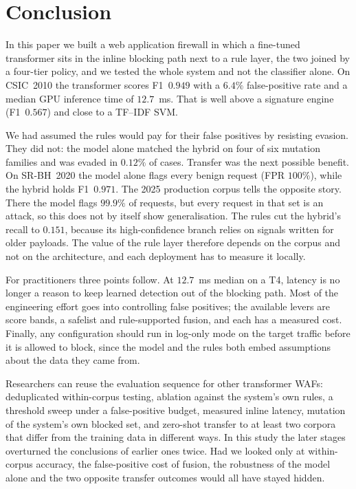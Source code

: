 \documentclass[preprint,11pt]{elsarticle}
\begin{document}
\section{Conclusion}
\label{sec:conclusion}
In this paper we built a web application firewall in which a fine-tuned
transformer sits in the inline blocking path next to a rule layer, the two
joined by a four-tier policy, and we tested the whole system and not the
classifier alone. On CSIC~2010 the transformer scores F1~$0.949$ with a
$6.4\%$ false-positive rate and a median GPU inference time of $12.7$~ms.
That is well above a signature engine (F1~$0.567$) and close to a TF--IDF
SVM.

We had assumed the rules would pay for their false positives by resisting
evasion. They did not: the model alone matched the hybrid on four of six
mutation families and was evaded in $0.12\%$ of cases. Transfer was the
next possible benefit. On SR-BH~2020 the model alone flags every benign
request (FPR $100\%$), while the hybrid holds F1~$0.971$. The 2025
production corpus tells the opposite story. There the model flags $99.9\%$
of requests, but every request in that set is an attack, so this does not
by itself show generalisation. The rules cut the hybrid's recall to
$0.151$, because its high-confidence branch relies on signals written for
older payloads. The value of the rule layer therefore depends on the
corpus and not on the architecture, and each deployment has to measure it
locally.

For practitioners three points follow. At $12.7$~ms median on a T4, latency
is no longer a reason to keep learned detection out of the blocking path.
Most of the engineering effort goes into controlling false positives; the
available levers are score bands, a safelist and rule-supported fusion, and
each has a measured cost. Finally, any configuration should run in log-only
mode on the target traffic before it is allowed to block, since the model
and the rules both embed assumptions about the data they came from.

Researchers can reuse the evaluation sequence for other transformer WAFs:
deduplicated within-corpus testing, ablation against the system's own rules,
a threshold sweep under a false-positive budget, measured inline latency,
mutation of the system's own blocked set, and zero-shot transfer to at least
two corpora that differ from the training data in different ways. In this
study the later stages overturned the conclusions of earlier ones twice.
Had we looked only at within-corpus accuracy, the false-positive cost of
fusion, the robustness of the model alone and the two opposite transfer
outcomes would all have stayed hidden.
\end{document}
